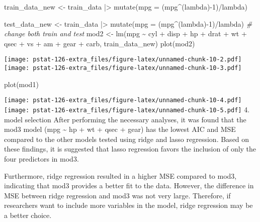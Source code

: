 \documentclass[
]{article}
\newenvironment{Shaded}{\begin{snugshade}}{\end{snugshade}}
\newcommand{\AttributeTok}[1]{\textcolor[rgb]{0.77,0.63,0.00}{#1}}
\newcommand{\CommentTok}[1]{\textcolor[rgb]{0.56,0.35,0.01}{\textit{#1}}}
\newcommand{\DecValTok}[1]{\textcolor[rgb]{0.00,0.00,0.81}{#1}}
\newcommand{\FunctionTok}[1]{\textcolor[rgb]{0.00,0.00,0.00}{#1}}
\newcommand{\NormalTok}[1]{#1}
\newcommand{\OtherTok}[1]{\textcolor[rgb]{0.56,0.35,0.01}{#1}}
\newcommand{\SpecialCharTok}[1]{\textcolor[rgb]{0.00,0.00,0.00}{#1}}
\begin{document}
\begin{Shaded}
\begin{Highlighting}[]
\NormalTok{train\_data\_new }\OtherTok{\textless{}{-}}\NormalTok{ train\_data }\SpecialCharTok{|\textgreater{}}
  \FunctionTok{mutate}\NormalTok{(}\AttributeTok{mpg =}\NormalTok{ (mpg}\SpecialCharTok{\^{}}\NormalTok{(lambda)}\SpecialCharTok{{-}}\DecValTok{1}\NormalTok{)}\SpecialCharTok{/}\NormalTok{lambda)}

\NormalTok{test\_data\_new }\OtherTok{\textless{}{-}}\NormalTok{ train\_data }\SpecialCharTok{|\textgreater{}}
  \FunctionTok{mutate}\NormalTok{(}\AttributeTok{mpg =}\NormalTok{ (mpg}\SpecialCharTok{\^{}}\NormalTok{(lambda)}\SpecialCharTok{{-}}\DecValTok{1}\NormalTok{)}\SpecialCharTok{/}\NormalTok{lambda)}
\CommentTok{\# change both train and test}
\NormalTok{mod2 }\OtherTok{\textless{}{-}} \FunctionTok{lm}\NormalTok{(mpg }\SpecialCharTok{\textasciitilde{}}\NormalTok{ cyl }\SpecialCharTok{+}\NormalTok{ disp }\SpecialCharTok{+}\NormalTok{ hp }\SpecialCharTok{+}\NormalTok{ drat }\SpecialCharTok{+}\NormalTok{ wt }\SpecialCharTok{+}\NormalTok{ qsec }\SpecialCharTok{+}\NormalTok{ vs }\SpecialCharTok{+}\NormalTok{ am }\SpecialCharTok{+}\NormalTok{ gear }\SpecialCharTok{+}\NormalTok{ carb,}
\NormalTok{           train\_data\_new)}
\FunctionTok{plot}\NormalTok{(mod2)}
\end{Highlighting}
\end{Shaded}

\texttt{[image: pstat-126-extra\_files/figure-latex/unnamed-chunk-10-2.pdf]}
\texttt{[image: pstat-126-extra\_files/figure-latex/unnamed-chunk-10-3.pdf]}

\begin{Shaded}
\begin{Highlighting}[]
\FunctionTok{plot}\NormalTok{(mod1)}
\end{Highlighting}
\end{Shaded}

\texttt{[image: pstat-126-extra\_files/figure-latex/unnamed-chunk-10-4.pdf]}
\texttt{[image: pstat-126-extra\_files/figure-latex/unnamed-chunk-10-5.pdf]}
4. model selection After performing the necessary analyses, it was found
that the mod3 model (mpg \textasciitilde{} hp + wt + qsec + gear) has
the lowest AIC and MSE compared to the other models tested using ridge
and lasso regression. Based on these findings, it is suggested that
lasso regression favors the inclusion of only the four predictors in
mod3.

Furthermore, ridge regression resulted in a higher MSE compared to mod3,
indicating that mod3 provides a better fit to the data. However, the
difference in MSE between ridge regression and mod3 was not very large.
Therefore, if researchers want to include more variables in the model,
ridge regression may be a better choice.
\end{document}
